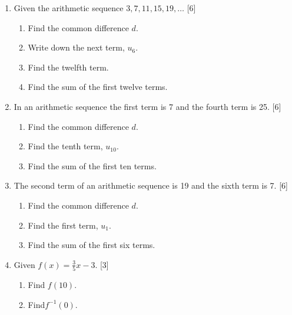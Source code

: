 \documentclass[12pt, twoside]{article}
\begin{document}
\begin{enumerate}
\item Given the arithmetic sequence $3,7,11,15,19, \dots$ \hfill [6]
  \begin{enumerate}[itemsep=1cm]
    \item Find the common difference $d$.
    \item Write down the next term, $u_6$.
    \item Find the twelfth term.\vspace{1cm}
    \item Find the sum of the first twelve terms.
  \end{enumerate} \vspace{2cm}

\item In an arithmetic sequence the first term is 7 and the fourth term is 25. \hfill [6]
  \begin{enumerate}[itemsep=2cm]
    \item Find the common difference $d$.
    \item Find the tenth term, $u_{10}$.\vspace{1cm}
    \item Find the sum of the first ten terms.
  \end{enumerate} \vspace{3cm}

\newpage
\item The second term of an arithmetic sequence is 19 and the sixth term is 7. \hfill [6]
  \begin{enumerate}[itemsep=3cm]
    \item Find the common difference $d$.
    \item Find the first term, $u_{1}$.
    \item Find the sum of the first six terms.
  \end{enumerate} \vspace{2cm}

\item Given $f(x)=\frac{3}{5}x-3$.  \hfill [3]
\begin{enumerate}
  \item Find $f(10)$. \vspace{2cm}
  \item Find$f^{-1}(0)$.
\end{enumerate} \vspace{4cm}


\end{enumerate}
\end{document}

